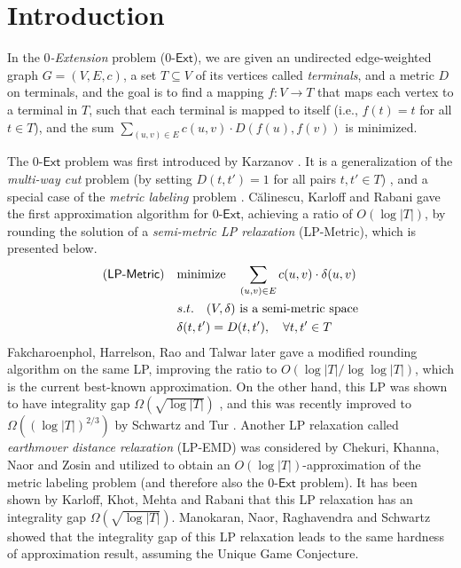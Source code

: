 \documentclass[11pt]{article}
\theoremstyle{definition}
\newcommand{\ze}{$0$-$\textsf{Ext}$\xspace}
\begin{document}
\section{Introduction}

In the \emph{$0$-Extension} problem (\ze), we are given an undirected edge-weighted graph $G=(V,E,c)$, a set $T\subseteq V$ of its vertices called \emph{terminals}, and a metric $D$ on terminals, and the goal is to find a mapping $f: V\to T$ that maps each vertex to a terminal in $T$, such that each terminal is mapped to itself (i.e., $f(t)=t$ for all $t\in T$), and the sum $\sum_{(u,v)\in E}c{(u,v)}\cdot D(f(u),f(v))$ is minimized.

The \ze problem was first introduced by Karzanov \cite{karzanov1998minimum}. It is a generalization of the \emph{multi-way cut} problem (by setting $D(t,t')=1$ for all pairs $t,t'\in T$) \cite{dahlhaus1994complexity,cualinescu1998improved,freund2000lower,buchbinder2013simplex,angelidakis2017improved,buchbinder2017simplex,berczi2020improving}, and a special case of the \emph{metric labeling} problem \cite{kleinberg2002approximation,chekuri2004linear,archer2004approximate,karloff2006earthmover,chuzhoy2007hardness}.
C\u{a}linescu, Karloff and Rabani \cite{calinescu2005approximation} gave the first approximation algorithm for \ze, achieving a ratio of $O(\log |T|)$, by rounding the solution of a \emph{semi-metric LP relaxation} (\textsf{LP-Metric}), which is presented below.
%
\begin{eqnarray*}
	\mbox{(\textsf{LP-Metric})}\quad &  \text{minimize}\quad  \sum_{(u,v)\in E}c(u,v)\cdot \delta(u,v)\\
	& s.t. \quad (V,\delta) \text{ is a semi-metric space}\\
	& \delta(t,t')=D(t,t'), \quad\forall t,t'\in T
\end{eqnarray*}
Fakcharoenphol, Harrelson, Rao and
Talwar \cite{fakcharoenphol2003improved} later gave a modified rounding algorithm on the same LP, improving the ratio to $O(\log |T|/\log\log |T|)$, which is the current best-known approximation. On the other hand, this LP was shown to have integrality gap $\Omega(\sqrt{\log |T|})$ \cite{calinescu2005approximation}, and this was recently improved to $\Omega((\log |T|)^{2/3})$ by Schwartz and Tur \cite{schwartz2021metric}.
Another LP relaxation called \emph{earthmover distance relaxation} (\textsf{LP-EMD}) was considered by Chekuri, Khanna, Naor and Zosin \cite{chekuri2004linear} and utilized to obtain an $O(\log |T|)$-approximation of the metric labeling problem (and therefore also the \ze problem). It has been shown \cite{karloff2009earthmover} by Karloff, Khot, Mehta and Rabani that this LP relaxation has an integrality gap $\Omega(\sqrt{\log |T|})$. Manokaran, Naor, Raghavendra
and Schwartz \cite{manokaran2008sdp} showed that the integrality gap of this LP relaxation leads to the same hardness of approximation result, assuming the Unique Game Conjecture.
\end{document}
